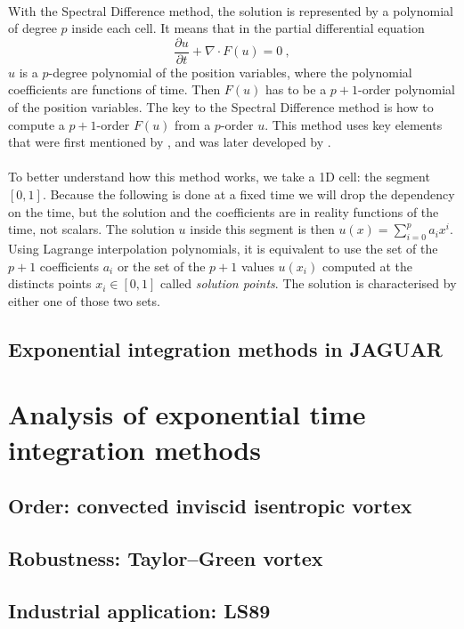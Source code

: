       \paragraph{}
      With the Spectral Difference method, the solution is represented by a polynomial of degree $p$ inside each cell.
      It means that in the partial differential equation
      \begin{equation}
        \frac{\partial u}{\partial t} + \nabla \cdot F\left(u\right) = 0 \ ,
      \end{equation}
      $u$ is a $p$-degree polynomial of the position variables, where the polynomial coefficients are functions of time.
      Then $F\left(u\right)$ has to be a $p + 1$-order polynomial of the position variables.
      The key to the Spectral Difference method is how to compute a $p + 1$-order $F\left(u\right)$ from a $p$-order $u$.
      This method uses key elements that were first mentioned by \cite{Kopriva1996}, and was later developed by \cite{LiuVinokurWang2006}.

      \paragraph{}
      To better understand how this method works, we take a 1D cell: the segment $\left[0, 1\right]$.
      Because the following is done at a fixed time we will drop the dependency on the time, but the solution and the coefficients are in reality functions of the time, not scalars.
      The solution $u$ inside this segment is then $u\left(x\right) = \sum_{i=0}^p a_ix^i$.
      Using Lagrange interpolation polynomials, it is equivalent to use the set of the $p + 1$ coefficients $a_i$ or the set of the $p + 1$ values $u\left(x_i\right)$ computed at the distincts points $x_i \in \left[0, 1\right]$ called \emph{solution points}.
      The solution is characterised by either one of those two sets.




    \subsection{Exponential integration methods in JAGUAR}






  \section{Analysis of exponential time integration methods}

    \subsection{Order: convected inviscid isentropic vortex}
    \subsection{Robustness: Taylor--Green vortex}
    \subsection{Industrial application: LS89}
